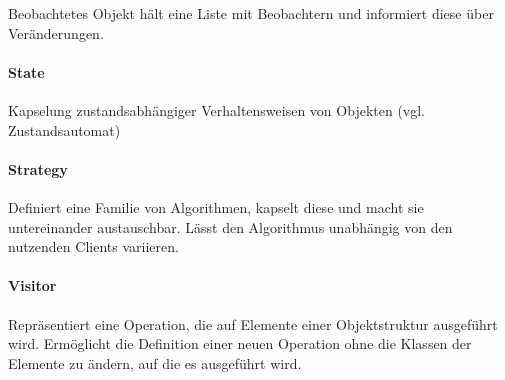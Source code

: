 Beobachtetes Objekt hält eine Liste mit Beobachtern und informiert diese über
Veränderungen.

\paragraph{State}\label{state}

Kapselung zustandsabhängiger Verhaltensweisen von Objekten (vgl.
Zustandsautomat)

\paragraph{Strategy}\label{strategy}

Definiert eine Familie von Algorithmen, kapselt diese und macht sie
untereinander austauschbar. Lässt den Algorithmus unabhängig von den nutzenden
Clients variieren.


%

\paragraph{Visitor}\label{visitor}

Repräsentiert eine Operation, die auf Elemente einer Objektstruktur ausgeführt
wird. Ermöglicht die Definition einer neuen Operation ohne die Klassen der
Elemente zu ändern, auf die es ausgeführt wird.
